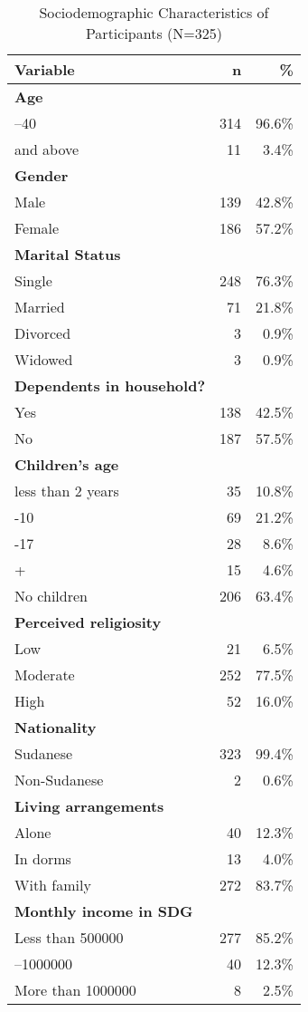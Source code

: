 \documentclass[12pt]{article}
\begin{document}
\begin{table}[h!]
\centering
\caption{Sociodemographic Characteristics of Participants (N=325)}
\label{tab:table1}
\begin{tabular}{lrr}
\toprule
\textbf{Variable} & \textbf{n} & \textbf{\%} \\
\midrule
\textbf{Age} & & \\
\quad 18–40 & 314 & 96.6\% \\
\quad 41 and above & 11 & 3.4\% \\
\midrule
\textbf{Gender} & & \\
\quad Male & 139 & 42.8\% \\
\quad Female & 186 & 57.2\% \\
\midrule
\textbf{Marital Status} & & \\
\quad Single & 248 & 76.3\% \\
\quad Married & 71 & 21.8\% \\
\quad Divorced & 3 & 0.9\% \\
\quad Widowed & 3 & 0.9\% \\
\midrule
\textbf{Dependents in household?} & & \\
\quad Yes & 138 & 42.5\% \\
\quad No & 187 & 57.5\% \\
\midrule
\textbf{Children’s age} & & \\
\quad less than 2 years & 35 & 10.8\% \\
\quad 2-10 & 69 & 21.2\% \\
\quad 11-17 & 28 & 8.6\% \\
\quad 18+ & 15 & 4.6\% \\
\quad No children & 206 & 63.4\% \\
\midrule
\textbf{Perceived religiosity} & & \\
\quad Low & 21 & 6.5\% \\
\quad Moderate & 252 & 77.5\% \\
\quad High & 52 & 16.0\% \\
\midrule
\textbf{Nationality} & & \\
\quad Sudanese & 323 & 99.4\% \\
\quad Non-Sudanese & 2 & 0.6\% \\
\midrule
\textbf{Living arrangements} & & \\
\quad Alone & 40 & 12.3\% \\
\quad In dorms & 13 & 4.0\% \\
\quad With family & 272 & 83.7\% \\
\midrule
\textbf{Monthly income in SDG} & & \\
\quad Less than 500000 & 277 & 85.2\% \\
\quad 500000–1000000 & 40 & 12.3\% \\
\quad More than 1000000 & 8 & 2.5\% \\
\bottomrule
\end{tabular}
\end{table}
\end{document}
